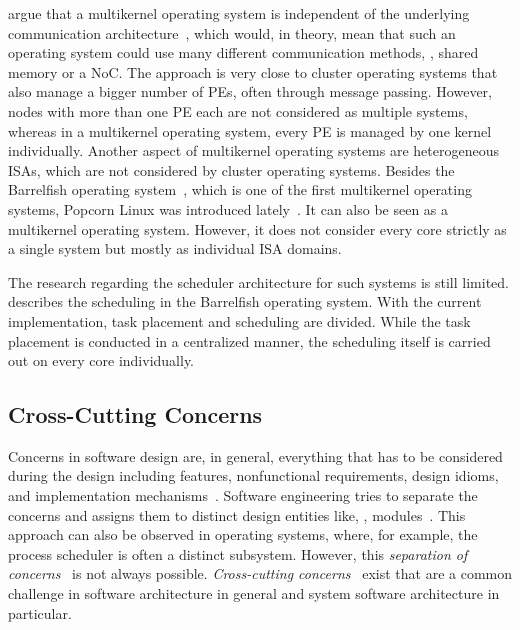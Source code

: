  argue that a multikernel operating system is independent of the underlying communication architecture~\cite[\ppno~38\psq(9\psq)]{Baumann-2009-Multikernel}, which would, in theory, mean that such an operating system could use many different communication methods, \eg, shared memory or a \ac{NoC}. The approach is very close to cluster operating systems that also manage a bigger number of \acp{PE}, often through message passing. However, nodes with more than one \ac{PE} each are not considered as multiple systems, whereas in a multikernel operating system, every \ac{PE} is managed by one kernel individually. Another aspect of multikernel operating systems are heterogeneous \acp{ISA}, which are not considered by cluster operating systems. Besides the Barrelfish operating system~\cite{Barrelfish}, which is one of the first multikernel operating systems, Popcorn Linux was introduced lately~\cite{Barbalace-2015-PopcornLinux}. It can also be seen as a multikernel operating system. However, it does not consider every core strictly as a single system but mostly as individual \ac{ISA} domains.

The research regarding the scheduler architecture for such systems is still limited. \Textcite[Ch.~3]{Peter-2012-BarrelfishSched} describes the scheduling in the Barrelfish operating system. With the current implementation, task placement and scheduling are divided. While the task placement is conducted in a centralized manner, the scheduling itself is carried out on every core individually.

\subsection{Cross-Cutting Concerns}

Concerns in software design are, in general, everything that has to be considered during the design including features, nonfunctional requirements, design idioms, and implementation mechanisms~\cite{Robillard-2007-Concerns}. Software engineering tries to separate the concerns and assigns them to distinct design entities like, \eg, modules~\cite{Parnas-1972-DecompositionCriteria}. This approach can also be observed in operating systems, where, for example, the process scheduler is often a distinct subsystem. However, this \emph{separation of concerns}~\cite{Huersch-1995-SeparationOfConcerns} is not always possible. \emph{Cross-cutting concerns}~\cite{Kiczales-1997-AOP} exist that are a common challenge in software architecture in general and system software architecture in particular.

